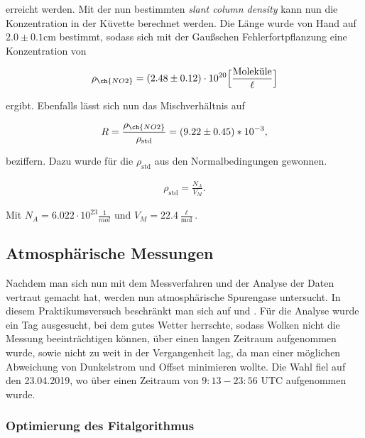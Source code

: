 \documentclass[12pt, a4paper, bibliography=totoc]{scrartcl}
\begin{document}
\begin{multicols}{2}
erreicht werden.
Mit der nun bestimmten \textit{slant column density} kann nun die  Konzentration in der Küvette berechnet werden.
Die Länge wurde von Hand auf $2.0 \pm 0.1$\si{cm} bestimmt, sodass sich mit der Gaußschen Fehlerfortpflanzung eine Konzentration von

\begin{align}
    \rho_{\ch{NO2}} = (2.48 \pm 0.12) \cdot 10^{20} \Bigl[ \frac{\text{Moleküle}}{\ell}\Bigr]
\end{align}

ergibt.	
Ebenfalls lässt sich nun das Mischverhältnis auf

\begin{align}
    R = \frac{\rho_{\ch{NO2}}}{\rho_{\text{std}}} = (9.22 \pm 0.45) *10^{-3},
\end{align}

beziffern. Dazu wurde für die $\rho_{\text{std}}$ aus den Normalbedingungen gewonnen.

\begin{align}
    \rho_{\text{std}} = \frac{N_A}{V_M}.
\end{align}
 	
Mit $N_A = 6.022 \cdot 10^{23} \frac{1}{\si{mol}}$ und $V_M = 22.4 \frac{\ell}{\si{\mol}}$.

\subsection{Atmosphärische Messungen}\label{ssec:atmospheric_measurements}

Nachdem man sich nun mit dem Messverfahren und der Analyse der Daten vertraut gemacht hat, werden nun atmosphärische Spurengase untersucht. In diesem Praktikumsversuch beschränkt man sich auf  und .
Für die Analyse wurde ein Tag ausgesucht, bei dem gutes Wetter herrschte, sodass Wolken nicht die Messung beeinträchtigen können, über einen langen Zeitraum aufgenommen wurde, sowie nicht zu weit in der Vergangenheit lag, da man einer möglichen Abweichung von Dunkelstrom und Offset minimieren wollte.
Die Wahl fiel auf den 23.04.2019, wo über einen Zeitraum von $9:13 - 23:56$ UTC aufgenommen wurde.

\subsubsection{Optimierung des Fitalgorithmus}\label{sssec:configure_fit}


\end{multicols}
\end{document}
